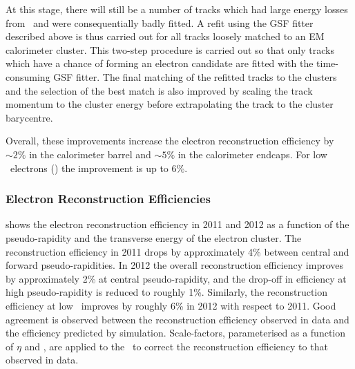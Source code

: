 At this stage, there will still be a number of tracks which had large energy
losses from \brem\ and were consequentially badly fitted. A refit using the GSF
fitter described above is thus carried out for all tracks loosely matched to an
EM calorimeter cluster. This two-step procedure is carried out so that only
tracks which have a chance of forming an electron candidate are fitted with the
time-consuming GSF fitter.
The final matching of the refitted tracks
to the clusters and the selection of the best match is also improved by scaling the
track momentum to the cluster energy before extrapolating the track to the
cluster barycentre. 

Overall, these improvements increase the electron reconstruction efficiency by
$\sim2\%$ in the calorimeter barrel and $\sim5\%$ in the calorimeter endcaps.
For low \et\ electrons () the improvement is up to 6\%.

\subsubsection{Electron Reconstruction Efficiencies}

 shows the electron reconstruction efficiency in 2011 and 2012
as a function of the pseudo-rapidity and the transverse energy of the electron cluster.
The reconstruction efficiency in 2011 drops by approximately 4\% between central
and forward pseudo-rapidities. In 2012 the overall reconstruction efficiency
improves by approximately 2\% at central pseudo-rapidity, and the drop-off in
efficiency at high pseudo-rapidity is reduced to roughly 1\%. Similarly, the
reconstruction efficiency at low \et\ improves by roughly 6\% in 2012 with
respect to 2011. Good agreement is observed between the reconstruction
efficiency observed in data and the efficiency predicted by simulation.
Scale-factors, parameterised as a function of $\eta$ and \et, are applied to
the \mc\ to correct the reconstruction efficiency to that observed in
data.

